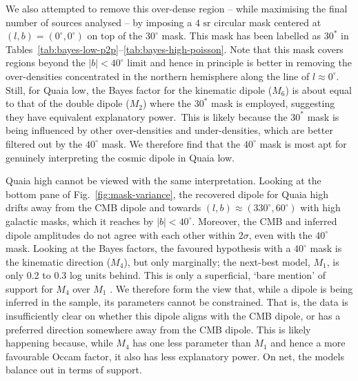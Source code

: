 \documentclass[fleqn,usenatbib]{mnras}
\begin{document}
    We also attempted to remove this over-dense region -- while maximising the final number of sources analysed -- by imposing a  $4\text{ sr}$ circular mask centered at $(l, b)=(0^\circ,0^\circ)$ on top of the $30^\circ$ mask.
    This mask has been labelled as $30^*$ in Tables~\ref{tab:bayes-low-p2p}--\ref{tab:bayes-high-poisson}. 
    Note that this mask covers regions beyond the $|b| < 40^\circ$ limit and hence in principle is better in removing the over-densities concentrated in the northern hemisphere along the line of $l \approx 0^\circ$.
    Still, for Quaia low, the Bayes factor for the kinematic dipole ($M_6$) is about equal to that of the double dipole ($M_2$) where the $30^*$ mask is employed, suggesting they have equivalent explanatory power.\
    This is likely because the $30^*$ mask is being influenced by other over-densities and under-densities, which are better filtered out by the $40^\circ$ mask.
    We therefore find that the $40^\circ$ mask is most apt for genuinely interpreting the cosmic dipole in Quaia low.
    
    Quaia high cannot be viewed with the same interpretation.
    Looking at the bottom pane of Fig.~\ref{fig:mask-variance}, the recovered dipole for Quaia high drifts away from the CMB dipole and towards $(l,b) \approx (330^\circ, 60^\circ)$ with high galactic masks, which it reaches by $|b| < 40^\circ$.
    Moreover, the CMB and inferred dipole amplitudes do not agree with each other within $2\sigma$, even with the $40^\circ$ mask.
    Looking at the Bayes factors, the favoured hypothesis with a $40^\circ$ mask is the kinematic direction ($M_4$), but only marginally; the next-best model, $M_1$, is only 0.2 to 0.3 log units behind.
    This is only a superficial, `bare mention' of support for $M_4$ over $M_1$ \citep{kass1995}.
    We therefore form the view that, while a dipole is being inferred in the sample, its parameters cannot be constrained.
    That is, the data is insufficiently clear on whether this dipole aligns with the CMB dipole, or has a preferred direction somewhere away from the CMB dipole.
    This is likely happening because, while $M_4$ has one less parameter than $M_1$ and hence a more favourable Occam factor, it also has less explanatory power.
    On net, the models balance out in terms of support.
\end{document}
